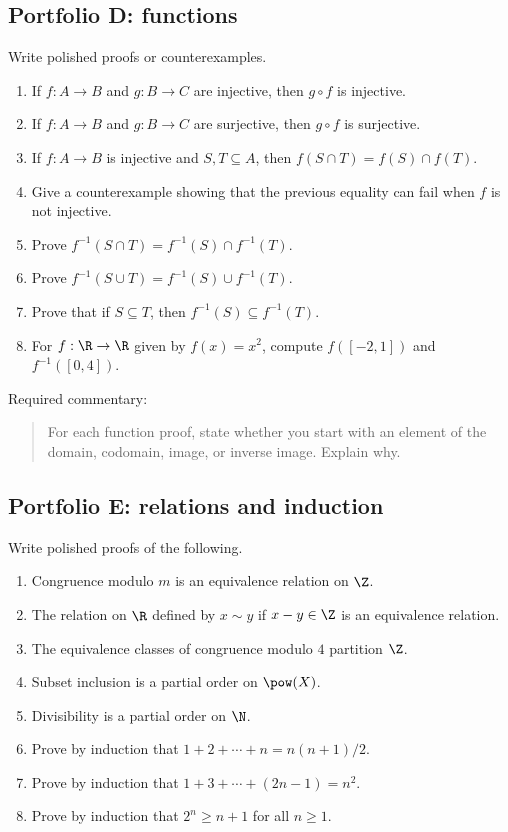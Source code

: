 \subsection{Portfolio D: functions}

Write polished proofs or counterexamples.

\begin{enumerate}
\item If $f:A\to B$ and $g:B\to C$ are injective, then $g\circ f$ is injective.
\item If $f:A\to B$ and $g:B\to C$ are surjective, then $g\circ f$ is surjective.
\item If $f:A\to B$ is injective and $S,T\subseteq A$, then $f(S\cap T)=f(S)\cap f(T)$.
\item Give a counterexample showing that the previous equality can fail when $f$ is not injective.
\item Prove $f^{-1}(S\cap T)=f^{-1}(S)\cap f^{-1}(T)$.
\item Prove $f^{-1}(S\cup T)=f^{-1}(S)\cup f^{-1}(T)$.
\item Prove that if $S\subseteq T$, then $f^{-1}(S)\subseteq f^{-1}(T)$.
\item For $f:\R\to\R$ given by $f(x)=x^2$, compute $f([-2,1])$ and $f^{-1}([0,4])$.
\end{enumerate}

Required commentary:

\begin{quote}
For each function proof, state whether you start with an element of the domain, codomain, image, or inverse image. Explain why.
\end{quote}

\subsection{Portfolio E: relations and induction}

Write polished proofs of the following.

\begin{enumerate}
\item Congruence modulo $m$ is an equivalence relation on $\Z$.
\item The relation on $\R$ defined by $x\sim y$ if $x-y\in\Z$ is an equivalence relation.
\item The equivalence classes of congruence modulo $4$ partition $\Z$.
\item Subset inclusion is a partial order on $\pow(X)$.
\item Divisibility is a partial order on $\N$.
\item Prove by induction that $1+2+\cdots+n=n(n+1)/2$.
\item Prove by induction that $1+3+\cdots+(2n-1)=n^2$.
\item Prove by induction that $2^n\geq n+1$ for all $n\geq1$.
\end{enumerate}

